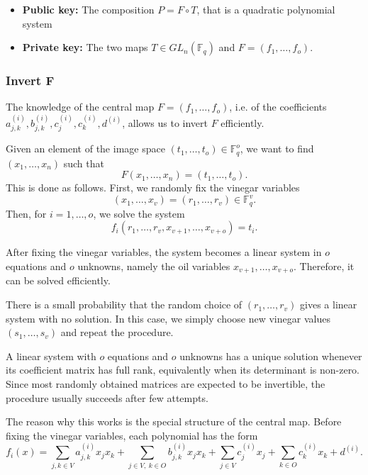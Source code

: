 \noindent
\begin{itemize}
    \item \textbf{Public key:} The composition $P = F \circ T$, that is a quadratic polynomial system
    \item \textbf{Private key:} The two maps $T \in GL_n(\mathbb{F}_q)$ and $F = (f_1, \ldots, f_o)$.
\end{itemize}

\subsubsection{Invert F}
\noindent
The knowledge of the central map \(F=(f_1,\dots,f_o)\), i.e. of the coefficients
\(a_{j,k}^{(i)}, b_{j,k}^{(i)}, c_j^{(i)}, c_k^{(i)}, d^{(i)}\), allows us to invert \(F\) efficiently.
\medskip

\noindent
Given an element of the image space \((t_1,\dots,t_o)\in\mathbb F_q^o\), we want to find
\((x_1,\dots,x_n)\) such that
\[
F(x_1,\dots,x_n)=(t_1,\dots,t_o).
\]
This is done as follows. First, we randomly fix the vinegar variables
\[
(x_1,\dots,x_v)=(r_1,\dots,r_v)\in\mathbb F_q^v.
\]
Then, for \(i=1,\dots,o\), we solve the system
\[
f_i(r_1,\dots,r_v,x_{v+1},\dots,x_{v+o})=t_i.
\]

\noindent
After fixing the vinegar variables, the system becomes a linear system in \(o\) equations and \(o\) unknowns, namely the oil variables \(x_{v+1},\dots,x_{v+o}\). Therefore, it can be solved efficiently.
\bigskip

\noindent
There is a small probability that the random choice of \((r_1,\dots,r_v)\) gives a linear system with no solution. In this case, we simply choose new vinegar values \((s_1,\dots,s_v)\) and repeat the procedure.
\medskip

\noindent
A linear system with \(o\) equations and \(o\) unknowns has a unique solution whenever its coefficient matrix has full rank, equivalently when its determinant is non-zero.\\
Since most randomly obtained matrices are expected to be invertible, the procedure usually succeeds after few attempts.

\bigskip

\noindent
The reason why this works is the special structure of the central map. Before fixing the vinegar variables, each polynomial has the form
\[
f_i(x)=
\sum_{j,k\in V} a_{j,k}^{(i)}x_jx_k
+
\sum_{j\in V,\ k\in O} b_{j,k}^{(i)}x_jx_k
+
\sum_{j\in V} c_j^{(i)}x_j
+
\sum_{k\in O} c_k^{(i)}x_k
+
d^{(i)}.
\]

